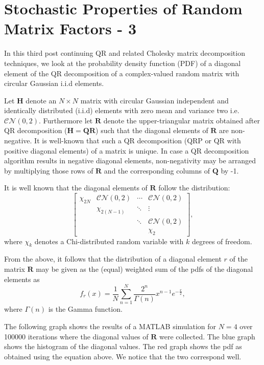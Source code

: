 \section{Stochastic Properties of Random Matrix Factors - 3}

In this third post continuing QR and related Cholesky matrix decomposition techniques, we look at the probability density function (PDF) of a diagonal element of the QR decomposition of a complex-valued random matrix with circular Gaussian i.i.d elements.

Let $\mathbf{H}$ denote an $N\times N$ matrix with circular Gaussian independent and identically distributed (i.i.d) elements with zero mean and variance two i.e. $\mathcal{CN}(0,2)$. Furthermore let $\mathbf{R}$ denote the upper-triangular matrix obtained after QR decomposition ($\mathbf{H} = \mathbf{Q}\mathbf{R}$) such that the diagonal elements of $\mathbf{R}$ are non-negative. It is well-known that such a QR decomposition (QRP or QR with positive diagonal elements) of a matrix is unique. In case a QR decomposition algorithm results in negative diagonal elements, non-negativity may be arranged by multiplying those rows of $\mathbf{R}$ and the corresponding columns of $\mathbf{Q}$ by -1.

It is well known that the diagonal elements of $\mathbf{R}$ follow the distribution:
$$
\begin{bmatrix}
	\chi_{2N} & \mathcal{CN}(0,2) & \cdots &  \mathcal{CN}(0,2)\\
	& \chi_{2(N-1)} & \ddots & \vdots\\
	& & \ddots & \mathcal{CN}(0,2)\\
	& & & \chi_{2}
\end{bmatrix},
$$
where $\chi_{k}$ denotes a Chi-distributed random variable with $k$ degrees of freedom.

From the above, it follows that the distribution of a diagonal element $r$ of the matrix $\mathbf{R}$ may be given as the (equal) weighted sum of the pdfs of the diagonal elements as
$$
f_r(x) = \frac{1}{N} \sum_{n=1}^{N} \frac{2^{n}}{\Gamma(n)} x^{n-1} e^{-\frac{x}{2}},
$$
where $\Gamma(n)$ is the Gamma function.

The following graph shows the results of a MATLAB simulation for $N=4$ over 100000 iterations where the diagonal values of $\mathbf{R}$ were collected. The blue graph shows the histogram of the diagonal values. The red graph shows the pdf as obtained using the equation above. We notice that the two correspond well.

